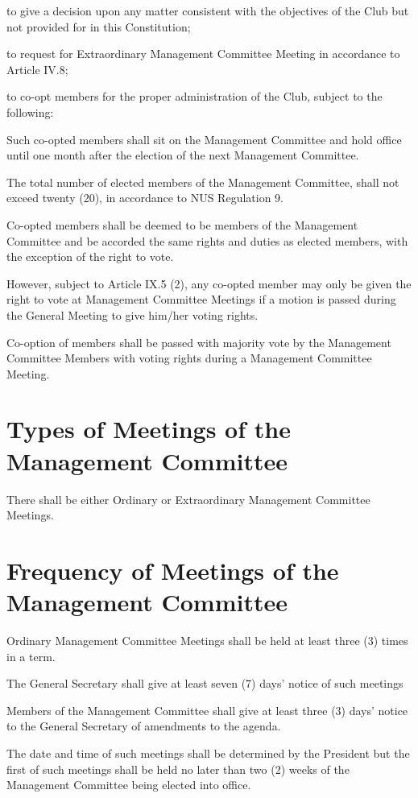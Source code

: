 \begin{legal}
	\item to give a decision upon any matter consistent with the objectives of the Club but not provided for in this Constitution;
	\item to request for Extraordinary Management Committee Meeting in accordance to Article IV.8;
	\item to co-opt members for the proper administration of the Club, subject to the following:
		\begin{legal}
		\item Such co-opted members shall sit on the Management Committee and hold office until one month after the election of the next Management Committee.
		\item The total number of elected members of the Management Committee, shall not exceed twenty (20), in accordance to NUS Regulation 9.
		\item Co-opted members shall be deemed to be members of the Management Committee and be accorded the same rights and duties as elected members, with the exception of the right to vote.
		\item However, subject to Article IX.5 (2), any co-opted member may only be given the right to vote at Management Committee Meetings if a motion is passed during the General Meeting to give him/her voting rights.
		\item Co-option of members shall be passed with majority vote by the Management Committee Members with voting rights during a Management Committee Meeting.
		\end{legal}
	\end{legal}

\section{Types of Meetings of the Management Committee}
There shall be either Ordinary or Extraordinary Management Committee Meetings.

\section{Frequency of Meetings of the Management Committee}
Ordinary Management Committee Meetings shall be held at least three (3) times in a term.
	\begin{legal}
	\item The General Secretary shall give at least seven (7) days’ notice of such meetings
	\item Members of the Management Committee shall give at least three (3) days’ notice to the General Secretary of amendments to the agenda.
	\item The date and time of such meetings shall be determined by the President but the first of such meetings shall be held no later than two (2) weeks of the Management Committee being elected into office.
	\end{legal}

